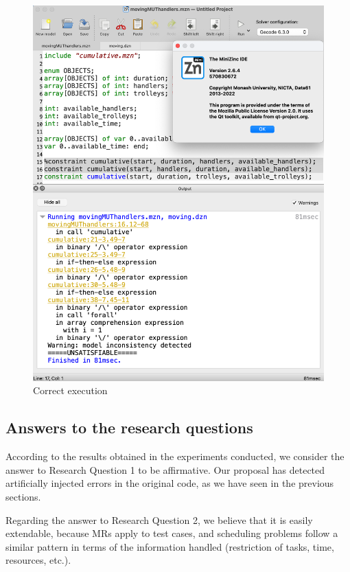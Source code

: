 \begin{figure}[!htb]
    \centering
    \includegraphics[scale = 0.28]{Figures/ScreenShot_minizinc_2_6_4_bug.png}
    \caption{Correct execution}
    \label{fig:ScreenShot_minizinc_2_6_4_bug}
\end{figure}


\subsection{Answers to the research questions}

According to the results obtained in the experiments conducted,
we consider the answer to Research Question 1 to be affirmative.
Our proposal has detected artificially
injected errors in the original code, as we have seen in
the previous sections. 


Regarding the answer to Research Question 2, we believe that it
is easily extendable, because MRs apply to test cases,
and scheduling problems follow a similar pattern in terms of the
information handled (restriction of tasks, time, resources, etc.).


